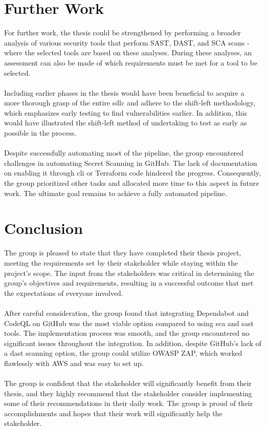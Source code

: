 \section{Further Work}
For further work, the thesis could be strengthened by performing a broader analysis of various security tools that perform SAST, DAST, and SCA scans -  where the selected tools are based on these analyses. During these analyses, an assessment can also be made of which requirements must be met for a tool to be selected. 
\\~\\
Including earlier phases in the thesis would have been beneficial to acquire a more thorough grasp of the entire \acrlong{sdlc} and adhere to the shift-left methodology, which emphasizes early testing to find vulnerabilities earlier. In addition, this would have illustrated the shift-left method of undertaking to test as early as possible in the process.  
\\~\\
Despite successfully automating most of the pipeline, the group encountered challenges in automating Secret Scanning in GitHub. The lack of documentation on enabling it through \acrshort{cli} or Terraform code hindered the progress. Consequently, the group prioritized other tasks and allocated more time to this aspect in future work. The ultimate goal remains to achieve a fully automated pipeline. 

\newpage
\section{Conclusion}
The group is pleased to state that they have completed their thesis project, meeting the requirements set by their stakeholder while staying within the project's scope. The input from the stakeholders was critical in determining the group's objectives and requirements, resulting in a successful outcome that met the expectations of everyone involved.
\\~\\
After careful consideration, the group found that integrating Dependabot and CodeQL on GitHub was the most viable option compared to using \acrshort{sca} and \acrshort{sast} tools. The implementation process was smooth, and the group encountered no significant issues throughout the integration. In addition, despite GitHub's lack of a \acrshort{dast} scanning option, the group could utilize OWASP ZAP, which worked flawlessly with AWS and was easy to set up.
\\~\\
The group is confident that the stakeholder will significantly benefit from their thesis, and they highly recommend that the stakeholder consider implementing some of their recommendations in their daily work. The group is proud of their accomplishments and hopes that their work will significantly help the stakeholder.
